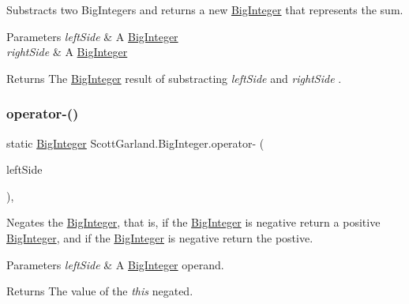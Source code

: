 Substracts two Big\+Integers and returns a new \hyperlink{class_scott_garland_1_1_big_integer}{Big\+Integer} that represents the sum. 


\begin{DoxyParams}{Parameters}
{\em left\+Side} & A \hyperlink{class_scott_garland_1_1_big_integer}{Big\+Integer}\\
\hline
{\em right\+Side} & A \hyperlink{class_scott_garland_1_1_big_integer}{Big\+Integer}\\
\hline
\end{DoxyParams}
\begin{DoxyReturn}{Returns}
The \hyperlink{class_scott_garland_1_1_big_integer}{Big\+Integer} result of substracting {\itshape left\+Side}  and {\itshape right\+Side} .
\end{DoxyReturn}
\mbox{\label{class_scott_garland_1_1_big_integer_a8584125cc3f3256f1496a1f6ca32720e}} 
\subsubsection{\texorpdfstring{operator-\/()}{operator-()}\hspace{0.1cm}{\footnotesize\ttfamily [2/2]}}
{\footnotesize\ttfamily static \hyperlink{class_scott_garland_1_1_big_integer}{Big\+Integer} Scott\+Garland.\+Big\+Integer.\+operator-\/ (\begin{DoxyParamCaption}\item[{\hyperlink{class_scott_garland_1_1_big_integer}{Big\+Integer}}]{left\+Side }\end{DoxyParamCaption})\hspace{0.3cm}{\ttfamily [inline]}, {\ttfamily [static]}}



Negates the \hyperlink{class_scott_garland_1_1_big_integer}{Big\+Integer}, that is, if the \hyperlink{class_scott_garland_1_1_big_integer}{Big\+Integer} is negative return a positive \hyperlink{class_scott_garland_1_1_big_integer}{Big\+Integer}, and if the \hyperlink{class_scott_garland_1_1_big_integer}{Big\+Integer} is negative return the postive. 


\begin{DoxyParams}{Parameters}
{\em left\+Side} & A \hyperlink{class_scott_garland_1_1_big_integer}{Big\+Integer} operand.\\
\hline
\end{DoxyParams}
\begin{DoxyReturn}{Returns}
The value of the {\itshape this}  negated.
\end{DoxyReturn}
\mbox{\label{class_scott_garland_1_1_big_integer_af2f8450c10cface5a4b597f1a7c53945}} 

